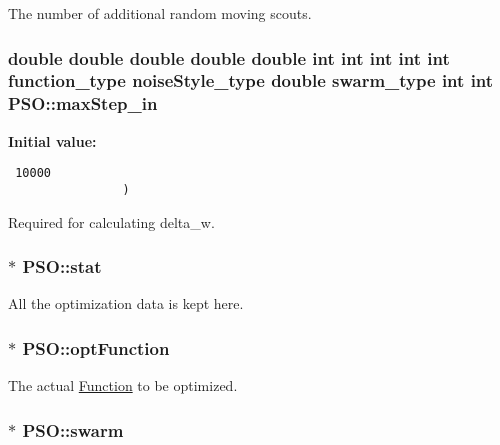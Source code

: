 The number of additional random moving scouts. 

\hypertarget{classPSO_6fd804144f0c462b022940a0713780c8}{
\subsubsection{\setlength{\rightskip}{0pt plus 5cm}double double double double double int int int int int {\bf function\_\-type} {\bf noiseStyle\_\-type} double {\bf swarm\_\-type} int int {\bf PSO::maxStep\_\-in}}}
\label{classPSO_6fd804144f0c462b022940a0713780c8}


\textbf{Initial value:}

\begin{Code}\begin{verbatim} 10000
                )
\end{verbatim}
\end{Code}
Required for calculating delta\_\-w. 

\hypertarget{classPSO_eb06f00703c13f9bce37dcd19f85878a}{
\subsubsection{$\ast$ {\bf PSO::stat}}}
\label{classPSO_eb06f00703c13f9bce37dcd19f85878a}


All the optimization data is kept here. 

\hypertarget{classPSO_2e4ade153c87e3ebd19c7e02ce2f8522}{
\subsubsection{$\ast$ {\bf PSO::optFunction}}}
\label{classPSO_2e4ade153c87e3ebd19c7e02ce2f8522}


The actual \hyperlink{classFunction}{Function} to be optimized. 

\hypertarget{classPSO_cd056ef7ca1e694cd770c2b800a1c31c}{
\subsubsection{$\ast$ {\bf PSO::swarm}}}
\label{classPSO_cd056ef7ca1e694cd770c2b800a1c31c}


